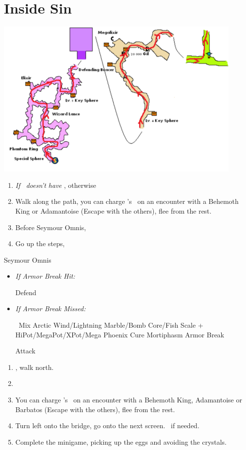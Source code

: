 \chapter{Inside Sin}
\includegraphics{graphics/sinpath}
\begin{enumerate}
	\item \textit{If \rikku\ doesn't have \od} \formation{\tidus}{\auron}{\rikku}, otherwise \formation{\tidus}{\auron}{\kimahri}
	\item Walk along the path, you can charge \rikku's \od\ on an encounter with a Behemoth King or Adamantoise (Escape with the others), flee from the rest.
	\item Before Seymour Omnis, \formation{\tidus}{\auron}{\yuna}
	\item Go up the steps, \sd
\end{enumerate}
\bothvfill\winvfill\lossvfill
\begin{battle}[80000]{Seymour Omnis}
	\begin{itemize}
		\yunaf Defend
		\tidusf Armor Break
		\item \textit{If Armor Break Hit:}
			\begin{itemize}
				\auronf Defend
			\end{itemize}
		\item \textit{If Armor Break Missed:}
			\begin{itemize}
				\switch{\auron}{\rikku}
				\rikkuf \od\ Mix Arctic Wind/Lightning Marble/Bomb Core/Fish Scale + HiPot/MegaPot/XPot/Mega Phoenix
				\yunaf Cure Mortiphasm
				\tidusf Armor Break
			\end{itemize}
		\summon{\bahamut}
		\bahamutf Attack
	\end{itemize}
\end{battle}
\begin{enumerate}[resume]
	\item \sd, walk north.
	\item \formation{\tidus}{\kimahri}{\auron}
	\item You can charge \rikku's \od\ on an encounter with a Behemoth King, Adamantoise or Barbatos (Escape with the others), flee from the rest.
	\item Turn left onto the bridge, go onto the next screen. \save\ if needed.
	\item Complete the minigame, picking up the eggs and avoiding the crystals.
\end{enumerate}
